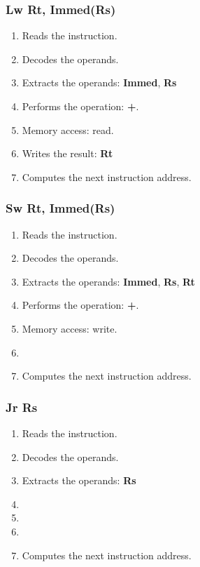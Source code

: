 
\begin{frame}
  \frametitle{Lw Rt, Immed(Rs)}

  \begin{enumerate}[<+->]
    \item
      Reads the instruction.
    \item
      Decodes the operands.
    \item
      Extracts the operands: \textbf{Immed}, \textbf{Rs}
    \item
      Performs the operation: \textbf{+}.
    \item
      Memory access: read.
    \item
      Writes the result: \textbf{Rt}
    \item
      Computes the next instruction address.
  \end{enumerate}
\end{frame}


\begin{frame}
  \frametitle{Sw Rt, Immed(Rs)}

  \begin{enumerate}[<+->]
    \item
      Reads the instruction.
    \item
      Decodes the operands.
    \item
      Extracts the operands: \textbf{Immed}, \textbf{Rs}, \textbf{Rt}
    \item
      Performs the operation: \textbf{+}.
    \item
      Memory access: write.
    \item

    \item
      Computes the next instruction address.
  \end{enumerate}
\end{frame}


\begin{frame}
  \frametitle{Jr Rs}

  \begin{enumerate}[<+->]
    \item
      Reads the instruction.
    \item
      Decodes the operands.
    \item
      Extracts the operands: \textbf{Rs}
    \item

    \item

    \item

    \item
      Computes the next instruction address.
  \end{enumerate}
\end{frame}

